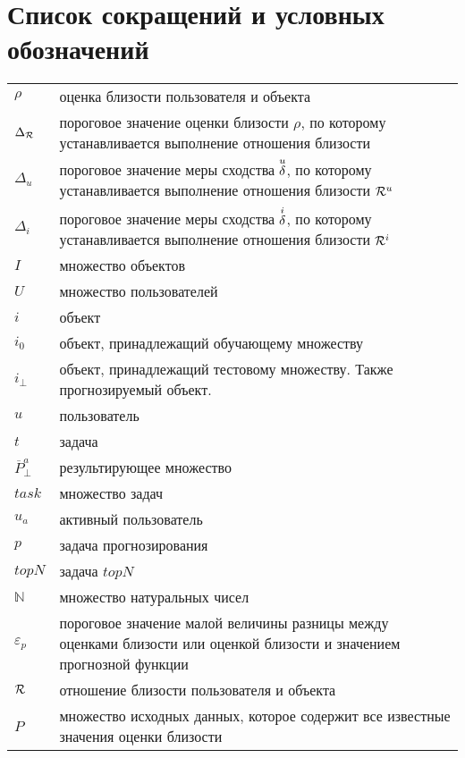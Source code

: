 \chapter*{Список сокращений и условных обозначений}             %
\noindent
\addtocounter{table}{-1}%
	\begin{longtable}{p{3cm}p{13cm}}
	$\rho$ & оценка близости пользователя и объекта\\
	$\Delta_{\mathcal{R}}$ & пороговое значение оценки близости $\rho$, по которому
	устанавливается выполнение отношения близости\\
		$\Delta_{u}$ & пороговое значение меры сходства ${\overset{u}{\mathcal{\delta}}}$, по которому
	устанавливается выполнение отношения близости $\mathcal{R}^u$\\
		$\Delta_{i}$ & пороговое значение меры сходства ${\overset{i}{\mathcal{\delta}}}$, по которому
	устанавливается выполнение отношения близости $\mathcal{R}^i$\\
	$I$ & множество объектов \\
	$U$ & множество пользователей \\
	$i$ & объект \\
	$i_0$ & объект, принадлежащий обучающему множеству \\
	$i_{\bot}$ & объект, принадлежащий тестовому множеству. Также
	прогнозируемый объект. \\
	$u$ & пользователь \\
	$t$ & задача\\
	$\overline{P}^a_{\bot}$ & результирующее множество \\
	$task$ & множество задач\\
	$u_a$ & активный пользователь \\
	$p$ & задача прогнозирования \\
	$topN$ & задача $topN$ \\
	$\mathbb{N}$ & множество натуральных чисел\\
	$\varepsilon_p$ & пороговое значение малой величины разницы между оценками
	близости или оценкой близости и значением прогнозной функции
	\\
	$\mathcal{R}$ & отношение близости пользователя и объекта \\
	$P$ & множество исходных данных, которое содержит все известные значения оценки близости \\

\end{longtable}
